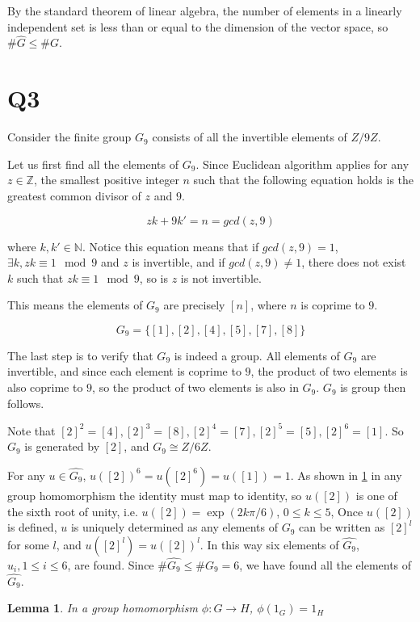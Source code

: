 \documentclass{article}
\newtheorem{lemma}[theorem]{Lemma}
\theoremstyle{definition}
\theoremstyle{definition}
\theoremstyle{remark}
\newcommand{\bb}[1]{\mathbb{#1}} %
\renewcommand{\hat}[1]{\widehat{#1}}
\newcommand{\hG}{\hat{G}}
\begin{document}
By the standard theorem of linear algebra, the number of elements in a linearly independent set is less than or equal to the dimension of the vector space, so $\#\hG \leq \#G$.


\section{Q3}

Consider the finite group $G_9$ consists of all the invertible elements of $Z/9Z$. 

Let us first find all the elements of $G_9$. Since Euclidean algorithm applies for any $z \in \bb{Z}$, the smallest positive integer $n$ such that the following equation holds is the greatest common divisor of $z$ and $9$.  

$$
z k + 9 k' = n = gcd(z, 9)
$$

where $k, k' \in \bb{N}$. 
Notice this equation means that if $gcd(z, 9) = 1$, $\exists k, z k \equiv 1 \mod 9$ and $z$ is invertible, and if $gcd(z, 9) \neq 1$, there does not exist $k$ such that $z k \equiv 1 \mod 9$, so is $z$ is not invertible.

This means the elements of $G_9$ are precisely $[n]$, where $n$ is coprime to $9$.

$$
G_9 = \{[1], [2], [4], [5], [7], [8]\}
$$

The last step is to verify that $G_9$ is indeed a group. 
All elements of $G_9$ are invertible, and since each element is coprime to $9$, the product of two elements is also coprime to $9$, so the product of two elements is also in $G_9$. 
$G_9$ is group then follows.

Note that $[2]^2 = [4], [2]^3 = [8], [2]^4 = [7], [2]^5 = [5], [2]^6 = [1]$. So $G_9$ is generated by $[2]$, and $G_9 \cong Z / 6Z$.

For any $u \in \hat{G_9}$,
$u([2])^6 = u([2]^6) = u([1]) = 1$. 
As shown in \ref{lm:homo} in any group homomorphism the identity must map to identity, so $u([2]) $  is one of the sixth root of unity, i.e. $ u([2]) = \exp(2 k \pi / 6)$, $0 \leq k \leq 5$,
Once $u([2])$ is defined, $u$ is uniquely determined as any elements of $G_9$ can be written as $[2]^l$ for some $l$, and $u([2]^l) = u([2])^l$.
In this way six elements of $\hat{G_9}$, $u_i, 1 \leq i \leq 6$, are found.
Since $\# \hat{G_9} \leq \# G_9 = 6$, we have found all the elements of $\hat{G_9}$.

\begin{lemma}\label{lm:homo}
	In a group homomorphism $\phi: G \rightarrow H$, $\phi(1_G) = 1_H$
\end{lemma}
\end{document}
